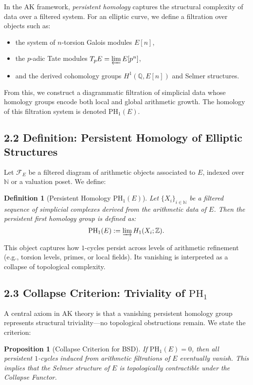 \documentclass[11pt]{article}
\newtheorem{definition}[theorem]{Definition}
\newtheorem{proposition}[theorem]{Proposition}
\begin{document}
In the AK framework, \emph{persistent homology} captures the structural complexity of data over a filtered system.  
For an elliptic curve, we define a filtration over objects such as:

\begin{itemize}
  \item the system of $n$-torsion Galois modules $E[n]$,
  \item the $p$-adic Tate modules $T_p E = \varprojlim E[p^n]$,
  \item and the derived cohomology groups $H^1(\mathbb{Q}, E[n])$ and Selmer structures.
\end{itemize}

From this, we construct a diagrammatic filtration of simplicial data whose homology groups encode both local and global arithmetic growth. The homology of this filtration system is denoted $\mathrm{PH}_1(E)$.

\subsection{2.2 Definition: Persistent Homology of Elliptic Structures}

Let $\mathcal{F}_E$ be a filtered diagram of arithmetic objects associated to $E$, indexed over $\mathbb{N}$ or a valuation poset.  
We define:

\begin{definition}[Persistent Homology $\mathrm{PH}_1(E)$]
Let $\{X_i\}_{i \in \mathbb{N}}$ be a filtered sequence of simplicial complexes derived from the arithmetic data of $E$.  
Then the persistent first homology group is defined as:
\[
\mathrm{PH}_1(E) := \varinjlim H_1(X_i; \mathbb{Z}).
\]
\end{definition}

This object captures how $1$-cycles persist across levels of arithmetic refinement (e.g., torsion levels, primes, or local fields).  
Its vanishing is interpreted as a collapse of topological complexity.

\subsection{2.3 Collapse Criterion: Triviality of $\mathrm{PH}_1$}

A central axiom in AK theory is that a vanishing persistent homology group represents structural triviality—no topological obstructions remain.  
We state the criterion:

\begin{proposition}[Collapse Criterion for BSD]
\label{prop:collapse-criterion}
If $\mathrm{PH}_1(E) = 0$, then all persistent $1$-cycles induced from arithmetic filtrations of $E$ eventually vanish.  
This implies that the Selmer structure of $E$ is topologically contractible under the Collapse Functor.
\end{proposition}
\end{document}
